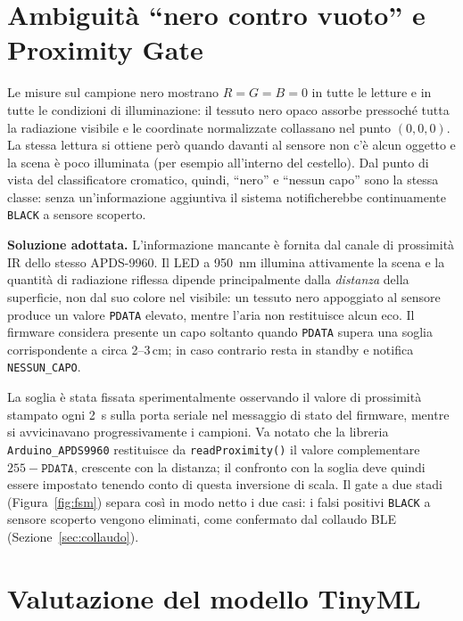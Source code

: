 \documentclass[11pt,a4paper,twoside,openany]{report}
\newenvironment{ucbox}{%
  \begin{mdframed}[
    backgroundcolor=ucbg,
    linecolor=ucborder,
    linewidth=1pt,
    innerleftmargin=10pt,
    innerrightmargin=10pt,
    innertopmargin=8pt,
    innerbottommargin=8pt,
    roundcorner=4pt
  ]
}{%
  \end{mdframed}
}
\begin{document}
\section{Ambiguità \enquote{nero contro vuoto} e Proximity Gate}
\label{sec:nero_vuoto}

Le misure sul campione nero mostrano $R = G = B = 0$ in tutte le
letture e in tutte le condizioni di illuminazione: il tessuto nero
opaco assorbe pressoché tutta la radiazione visibile e le coordinate
normalizzate collassano nel punto $(0,0,0)$. La stessa lettura si
ottiene però quando davanti al sensore non c'è alcun oggetto e la scena
è poco illuminata (per esempio all'interno del cestello). Dal punto di
vista del classificatore cromatico, quindi, \enquote{nero} e
\enquote{nessun capo} sono la stessa classe: senza un'informazione
aggiuntiva il sistema notificherebbe continuamente \texttt{BLACK} a
sensore scoperto.

\begin{ucbox}
\textbf{Soluzione adottata.} L'informazione mancante è fornita dal
canale di prossimità IR dello stesso APDS-9960. Il LED a \SI{950}{nm}
illumina attivamente la scena e la quantità di radiazione riflessa
dipende principalmente dalla \emph{distanza} della superficie, non dal
suo colore nel visibile: un tessuto nero appoggiato al sensore produce
un valore \texttt{PDATA} elevato, mentre l'aria non restituisce alcun
eco. Il firmware considera presente un capo soltanto quando
\texttt{PDATA} supera una soglia corrispondente a circa 2--3\,cm; in
caso contrario resta in standby e notifica \texttt{NESSUN\_CAPO}.
\end{ucbox}

La soglia è stata fissata sperimentalmente osservando il valore di
prossimità stampato ogni \SI{2}{s} sulla porta seriale nel messaggio
di stato del firmware, mentre si avvicinavano progressivamente i
campioni. Va notato che la
libreria \texttt{Arduino\_APDS9960} restituisce da
\texttt{readProximity()} il valore complementare $255 -
\texttt{PDATA}$, crescente con la distanza; il confronto con la soglia
deve quindi essere impostato tenendo conto di questa inversione di
scala. Il gate a due stadi (Figura~\ref{fig:fsm}) separa così in modo
netto i due casi: i falsi positivi \texttt{BLACK} a sensore scoperto
vengono eliminati, come confermato dal collaudo BLE
(Sezione~\ref{sec:collaudo}).

\section{Valutazione del modello TinyML}
\label{sec:modello}
\end{document}
